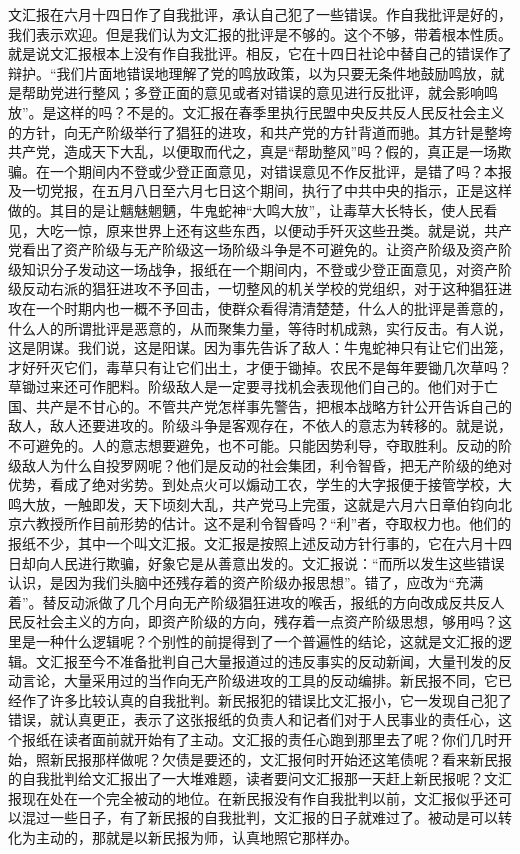文汇报在六月十四日作了自我批评，承认自己犯了一些错误。作自我批评是好的，我们表示欢迎。但是我们认为文汇报的批评是不够的。这个不够，带着根本性质。就是说文汇报根本上没有作自我批评。相反，它在十四日社论中替自己的错误作了辩护。“我们片面地错误地理解了党的鸣放政策，以为只要无条件地鼓励鸣放，就是帮助党进行整风；多登正面的意见或者对错误的意见进行反批评，就会影响鸣放”。是这样的吗？不是的。文汇报在春季里执行民盟中央反共反人民反社会主义的方针，向无产阶级举行了猖狂的进攻，和共产党的方针背道而驰。其方针是整垮共产党，造成天下大乱，以便取而代之，真是“帮助整风”吗？假的，真正是一场欺骗。在一个期间内不登或少登正面意见，对错误意见不作反批评，是错了吗？本报及一切党报，在五月八日至六月七日这个期间，执行了中共中央的指示，正是这样做的。其目的是让魑魅魍魉，牛鬼蛇神“大鸣大放”，让毒草大长特长，使人民看见，大吃一惊，原来世界上还有这些东西，以便动手歼灭这些丑类。就是说，共产党看出了资产阶级与无产阶级这一场阶级斗争是不可避免的。让资产阶级及资产阶级知识分子发动这一场战争，报纸在一个期间内，不登或少登正面意见，对资产阶级反动右派的猖狂进攻不予回击，一切整风的机关学校的党组织，对于这种猖狂进攻在一个时期内也一概不予回击，使群众看得清清楚楚，什么人的批评是善意的，什么人的所谓批评是恶意的，从而聚集力量，等待时机成熟，实行反击。有人说，这是阴谋。我们说，这是阳谋。因为事先告诉了敌人：牛鬼蛇神只有让它们出笼，才好歼灭它们，毒草只有让它们出土，才便于锄掉。农民不是每年要锄几次草吗？草锄过来还可作肥料。阶级敌人是一定要寻找机会表现他们自己的。他们对于亡国、共产是不甘心的。不管共产党怎样事先警告，把根本战略方针公开告诉自己的敌人，敌人还要进攻的。阶级斗争是客观存在，不依人的意志为转移的。就是说，不可避免的。人的意志想要避免，也不可能。只能因势利导，夺取胜利。反动的阶级敌人为什么自投罗网呢？他们是反动的社会集团，利令智昏，把无产阶级的绝对优势，看成了绝对劣势。到处点火可以煽动工农，学生的大字报便于接管学校，大鸣大放，一触即发，天下顷刻大乱，共产党马上完蛋，这就是六月六日章伯钧向北京六教授所作目前形势的估计。这不是利令智昏吗？“利”者，夺取权力也。他们的报纸不少，其中一个叫文汇报。文汇报是按照上述反动方针行事的，它在六月十四日却向人民进行欺骗，好象它是从善意出发的。文汇报说：“而所以发生这些错误认识，是因为我们头脑中还残存着的资产阶级办报思想”。错了，应改为“充满着”。替反动派做了几个月向无产阶级猖狂进攻的喉舌，报纸的方向改成反共反人民反社会主义的方向，即资产阶级的方向，残存着一点资产阶级思想，够用吗？这里是一种什么逻辑呢？个别性的前提得到了一个普遍性的结论，这就是文汇报的逻辑。文汇报至今不准备批判自己大量报道过的违反事实的反动新闻，大量刊发的反动言论，大量采用过的当作向无产阶级进攻的工具的反动编排。新民报不同，它已经作了许多比较认真的自我批判。新民报犯的错误比文汇报小，它一发现自己犯了错误，就认真更正，表示了这张报纸的负责人和记者们对于人民事业的责任心，这个报纸在读者面前就开始有了主动。文汇报的责任心跑到那里去了呢？你们几时开始，照新民报那样做呢？欠债是要还的，文汇报何时开始还这笔债呢？看来新民报的自我批判给文汇报出了一大堆难题，读者要问文汇报那一天赶上新民报呢？文汇报现在处在一个完全被动的地位。在新民报没有作自我批判以前，文汇报似乎还可以混过一些日子，有了新民报的自我批判，文汇报的日子就难过了。被动是可以转化为主动的，那就是以新民报为师，认真地照它那样办。

